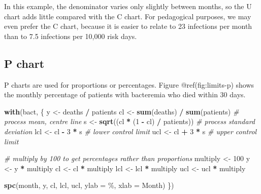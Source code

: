 \documentclass[
]{book}
\newenvironment{Shaded}{\begin{snugshade}}{\end{snugshade}}
\newcommand{\AttributeTok}[1]{\textcolor[rgb]{0.13,0.29,0.53}{#1}}
\newcommand{\CommentTok}[1]{\textcolor[rgb]{0.56,0.35,0.01}{\textit{#1}}}
\newcommand{\DecValTok}[1]{\textcolor[rgb]{0.00,0.00,0.81}{#1}}
\newcommand{\FunctionTok}[1]{\textcolor[rgb]{0.13,0.29,0.53}{\textbf{#1}}}
\newcommand{\NormalTok}[1]{#1}
\newcommand{\OtherTok}[1]{\textcolor[rgb]{0.56,0.35,0.01}{#1}}
\newcommand{\SpecialCharTok}[1]{\textcolor[rgb]{0.81,0.36,0.00}{\textbf{#1}}}
\newcommand{\StringTok}[1]{\textcolor[rgb]{0.31,0.60,0.02}{#1}}
\begin{document}
In this example, the denominator varies only slightly between months, so
the U chart adds little compared with the C chart. For pedagogical
purposes, we may even prefer the C chart, because it is easier to relate
to 23 infections per month than to 7.5 infections per 10,000 risk days.

\subsection{P chart}\label{p-chart}

P charts are used for proportions or percentages. Figure
@ref(fig:limits-p) shows the monthly percentage of patients with
bacteremia who died within 30 days.

\begin{Shaded}
\begin{Highlighting}[]
\FunctionTok{with}\NormalTok{(bact, \{}
\NormalTok{  y   }\OtherTok{\textless{}{-}}\NormalTok{ deaths }\SpecialCharTok{/}\NormalTok{ patients}
\NormalTok{  cl  }\OtherTok{\textless{}{-}} \FunctionTok{sum}\NormalTok{(deaths) }\SpecialCharTok{/} \FunctionTok{sum}\NormalTok{(patients)      }\CommentTok{\# process mean, centre line}
\NormalTok{  s   }\OtherTok{\textless{}{-}} \FunctionTok{sqrt}\NormalTok{((cl }\SpecialCharTok{*}\NormalTok{ (}\DecValTok{1} \SpecialCharTok{{-}}\NormalTok{ cl) }\SpecialCharTok{/}\NormalTok{ patients)) }\CommentTok{\# process standard deviation}
\NormalTok{  lcl }\OtherTok{\textless{}{-}}\NormalTok{ cl }\SpecialCharTok{{-}} \DecValTok{3} \SpecialCharTok{*}\NormalTok{ s                       }\CommentTok{\# lower control limit}
\NormalTok{  ucl }\OtherTok{\textless{}{-}}\NormalTok{ cl }\SpecialCharTok{+} \DecValTok{3} \SpecialCharTok{*}\NormalTok{ s                       }\CommentTok{\# upper control limit}
  
  \CommentTok{\# multiply by 100 to get percentages rather than proportions}
\NormalTok{  multiply }\OtherTok{\textless{}{-}} \DecValTok{100}
\NormalTok{  y        }\OtherTok{\textless{}{-}}\NormalTok{ y }\SpecialCharTok{*}\NormalTok{ multiply}
\NormalTok{  cl       }\OtherTok{\textless{}{-}}\NormalTok{ cl }\SpecialCharTok{*}\NormalTok{ multiply}
\NormalTok{  lcl      }\OtherTok{\textless{}{-}}\NormalTok{ lcl }\SpecialCharTok{*}\NormalTok{ multiply}
\NormalTok{  ucl      }\OtherTok{\textless{}{-}}\NormalTok{ ucl }\SpecialCharTok{*}\NormalTok{ multiply}
  
  \FunctionTok{spc}\NormalTok{(month, y, cl, lcl, ucl, }
      \AttributeTok{ylab =} \StringTok{\textquotesingle{}\%\textquotesingle{}}\NormalTok{, }
      \AttributeTok{xlab =} \StringTok{\textquotesingle{}Month\textquotesingle{}}\NormalTok{)}
\NormalTok{\})}
\end{Highlighting}
\end{Shaded}
\end{document}
